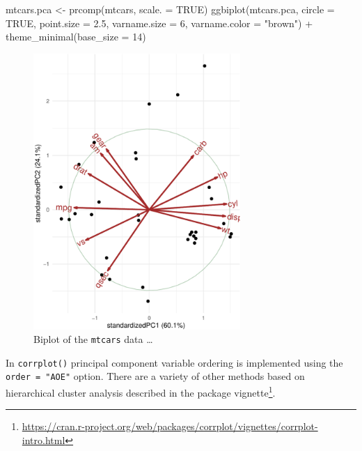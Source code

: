 \documentclass[
  letterpaper,
  10pt,
  krantz2]{krantz}
\makeatletter
\newenvironment{Shaded}{\begin{snugshade}}{\end{snugshade}}
\newcommand{\AttributeTok}[1]{\textcolor[rgb]{0.40,0.45,0.13}{#1}}
\newcommand{\ConstantTok}[1]{\textcolor[rgb]{0.56,0.35,0.01}{#1}}
\newcommand{\DecValTok}[1]{\textcolor[rgb]{0.68,0.00,0.00}{#1}}
\newcommand{\FloatTok}[1]{\textcolor[rgb]{0.68,0.00,0.00}{#1}}
\newcommand{\FunctionTok}[1]{\textcolor[rgb]{0.28,0.35,0.67}{#1}}
\newcommand{\NormalTok}[1]{\textcolor[rgb]{0.00,0.23,0.31}{#1}}
\newcommand{\OtherTok}[1]{\textcolor[rgb]{0.00,0.23,0.31}{#1}}
\newcommand{\SpecialCharTok}[1]{\textcolor[rgb]{0.37,0.37,0.37}{#1}}
\newcommand{\StringTok}[1]{\textcolor[rgb]{0.13,0.47,0.30}{#1}}
\providecommand{\href}[2]{#2\footnote{\url{#1}}}
\newenvironment{kframe}{%
  \medskip{}
  \setlength{\fboxsep}{.8em}
  \def\at@end@of@kframe{}%
  \ifinner\ifhmode%
  \def\at@end@of@kframe{\end{minipage}}%
  \begin{minipage}{\columnwidth}%
  \fi\fi%
  \def\FrameCommand##1{\hskip\@totalleftmargin \hskip-\fboxsep
  \colorbox{shadecolor}{##1}\hskip-\fboxsep
      \hskip-\linewidth \hskip-\@totalleftmargin \hskip\columnwidth}%
  \MakeFramed {\advance\hsize-\width
    \@totalleftmargin\z@ \linewidth\hsize
    \@setminipage}}%
{\par\unskip\endMakeFramed%
  \at@end@of@kframe}
\renewenvironment{Shaded}{\begin{kframe}}{\end{kframe}}
\makeatother
\begin{document}
\begin{Shaded}
\begin{Highlighting}[]
\NormalTok{mtcars.pca }\OtherTok{\textless{}{-}} \FunctionTok{prcomp}\NormalTok{(mtcars, }\AttributeTok{scale. =} \ConstantTok{TRUE}\NormalTok{)}
\FunctionTok{ggbiplot}\NormalTok{(mtcars.pca,}
         \AttributeTok{circle =} \ConstantTok{TRUE}\NormalTok{,}
         \AttributeTok{point.size =} \FloatTok{2.5}\NormalTok{,}
         \AttributeTok{varname.size =} \DecValTok{6}\NormalTok{,}
         \AttributeTok{varname.color =} \StringTok{"brown"}\NormalTok{) }\SpecialCharTok{+}
  \FunctionTok{theme\_minimal}\NormalTok{(}\AttributeTok{base\_size =} \DecValTok{14}\NormalTok{) }
\end{Highlighting}
\end{Shaded}

\begin{figure}[H]

{\centering \includegraphics[width=0.7\textwidth,height=\textheight]{figs/ch04/fig-mtcars-biplot-1.pdf}

}

\caption{\label{fig-mtcars-biplot}Biplot of the \texttt{mtcars} data
\ldots{}}

\end{figure}

In \texttt{corrplot()} principal component variable ordering is
implemented using the \texttt{order\ =\ "AOE"} option. There are a
variety of other methods based on hierarchical cluster analysis
described in the
\href{https://cran.r-project.org/web/packages/corrplot/vignettes/corrplot-intro.html}{package
vignette}.
\end{document}
